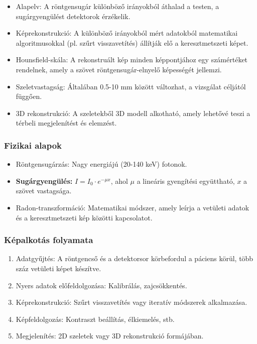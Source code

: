 \documentclass[a4paper,12pt]{article}
\begin{document}
\begin{itemize} \item Alapelv: A röntgensugár különböző irányokból áthalad a testen, a sugárgyengülést detektorok érzékelik. \item Képrekonstrukció: A különböző irányokból mért adatokból matematikai algoritmusokkal (pl. szűrt visszavetítés) állítják elő a keresztmetszeti képet. \item Hounsfield-skála: A rekonstruált kép minden képpontjához egy számértéket rendelnek, amely a szövet röntgensugár-elnyelő képességét jellemzi. \item Szeletvastagság: Általában 0.5-10 mm között változhat, a vizsgálat céljától függően. \item 3D rekonstrukció: A szeletekből 3D modell alkotható, amely lehetővé teszi a térbeli megjelenítést és elemzést. \end{itemize}

\subsubsection{Fizikai alapok} \begin{itemize} \item Röntgensugárzás: Nagy energiájú (20-140 keV) fotonok. 
\item \textbf{Sugárgyengülés:} \( I = I_0 \cdot e^{-\mu x} \), ahol \(\mu\) a lineáris gyengítési együttható, \(x\) a szövet vastagsága.
 
\item Radon-transzformáció: Matematikai módszer, amely leírja a vetületi adatok és a keresztmetszeti kép közötti kapcsolatot. \end{itemize}

\subsubsection{Képalkotás folyamata} \begin{enumerate} \item Adatgyűjtés: A röntgencső és a detektorsor körbefordul a páciens körül, több száz vetületi képet készítve. \item Nyers adatok előfeldolgozása: Kalibrálás, zajcsökkentés. \item Képrekonstrukció: Szűrt visszavetítés vagy iteratív módszerek alkalmazása. \item Képfeldolgozás: Kontraszt beállítás, élkiemelés, stb. \item Megjelenítés: 2D szeletek vagy 3D rekonstrukció formájában. \end{enumerate}
\end{document}
